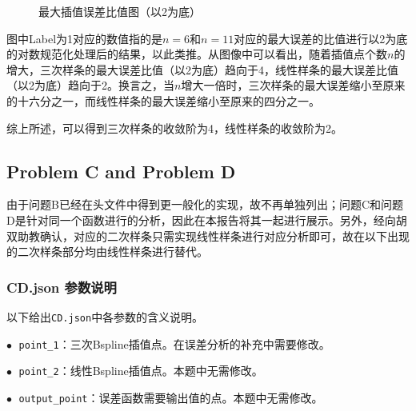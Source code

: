 \documentclass{ctexart}
\begin{document}
\begin{sloppypar}
\begin{figure}[H]
\caption{最大插值误差比值图（以2为底）}
\label{fig7}
\end{figure}
图中Label为1对应的数值指的是$n=6$和$n=11$对应的最大误差的比值进行以2为底的对数规范化处理后的结果，以此类推。从图像中可以看出，随着插值点个数$n$的增大，三次样条的最大误差比值（以2为底）趋向于4，线性样条的最大误差比值（以2为底）趋向于2。换言之，当$n$增大一倍时，三次样条的最大误差缩小至原来的十六分之一，而线性样条的最大误差缩小至原来的四分之一。

综上所述，可以得到三次样条的收敛阶为4，线性样条的收敛阶为2。

\subsection{Problem C and Problem D}
由于问题B已经在头文件中得到更一般化的实现，故不再单独列出；问题C和问题D是针对同一个函数进行的分析，因此在本报告将其一起进行展示。另外，经向胡双助教确认，对应的二次样条只需实现线性样条进行对应分析即可，故在以下出现的二次样条部分均由线性样条进行替代。
\subsubsection{CD.json 参数说明}
以下给出\verb|CD.json|中各参数的含义说明。

$\bullet \;$ \verb|point_1|：三次Bspline插值点。在误差分析的补充中需要修改。

$\bullet \;$ \verb|point_2|：线性Bspline插值点。本题中无需修改。

$\bullet \;$ \verb|output_point|：误差函数需要输出值的点。本题中无需修改。

\end{sloppypar}
\end{document}

